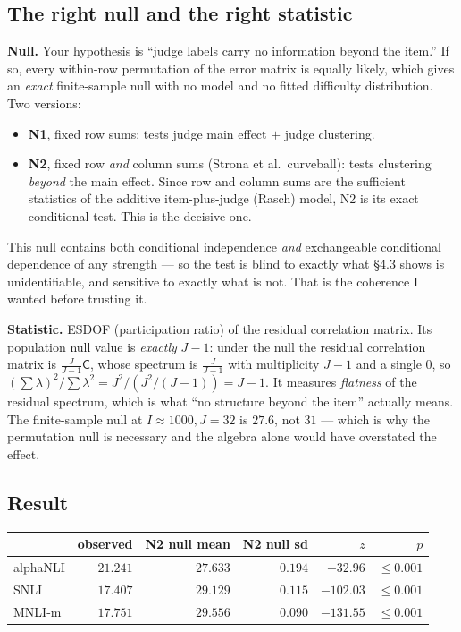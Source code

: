 \documentclass[11pt]{article}
\theoremstyle{definition}
\newcommand{\Cc}{\mathsf{C}}
\begin{document}
\subsection{The right null and the right statistic}

\textbf{Null.} Your hypothesis is ``judge labels carry no information beyond the
item.'' If so, every within-row permutation of the error matrix is equally likely,
which gives an \emph{exact} finite-sample null with no model and no fitted difficulty
distribution. Two versions:
\begin{itemize}
\item \textbf{N1}, fixed row sums: tests judge main effect $+$ judge clustering.
\item \textbf{N2}, fixed row \emph{and} column sums (Strona et al.\ curveball): tests
clustering \emph{beyond} the main effect. Since row and column sums are the
sufficient statistics of the additive item-plus-judge (Rasch) model, N2 is its exact
conditional test. This is the decisive one.
\end{itemize}
This null contains both conditional independence \emph{and} exchangeable conditional
dependence of any strength --- so the test is blind to exactly what
\S4.3 shows is unidentifiable, and sensitive to exactly what is not. That is the
coherence I wanted before trusting it.

\textbf{Statistic.} ESDOF (participation ratio) of the residual correlation matrix.
Its population null value is \emph{exactly} $J-1$: under the null the residual
correlation matrix is $\tfrac{J}{J-1}\Cc$, whose spectrum is $\tfrac{J}{J-1}$ with
multiplicity $J-1$ and a single $0$, so
$(\sum\lambda)^2/\sum\lambda^2=J^2/(J^2/(J-1))=J-1$. It measures \emph{flatness} of
the residual spectrum, which is what ``no structure beyond the item'' actually means.
The finite-sample null at $I\approx1000,J=32$ is $27.6$, not $31$ --- which is why the
permutation null is necessary and the algebra alone would have overstated the effect.

\subsection{Result}

\begin{center}
\begin{tabular}{lrrrrr}
\toprule
 & observed & N2 null mean & N2 null sd & $z$ & $p$\\
\midrule
alphaNLI & $21.241$ & $27.633$ & $0.194$ & $-32.96$ & $\le0.001$\\
SNLI     & $17.407$ & $29.129$ & $0.115$ & $-102.03$ & $\le0.001$\\
MNLI-m   & $17.751$ & $29.556$ & $0.090$ & $-131.55$ & $\le0.001$\\
\bottomrule
\end{tabular}
\end{center}
\end{document}
